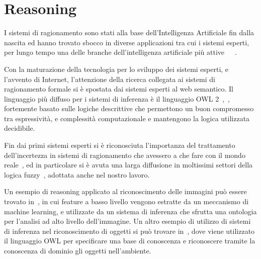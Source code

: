 \section{Reasoning}

I sistemi di ragionamento sono stati alla base dell'Intelligenza Artificiale fin dalla nascita ed hanno trovato sbocco in diverse applicazioni tra cui i sistemi esperti, per lungo tempo una delle branche dell'intelligenza artificiale più attive~\cite{buchanan1984rule}~\cite{davis1977production}~\cite{joseph1994riley}.

Con la maturazione della tecnologia per lo sviluppo dei sistemi esperti, e l'avvento di Internet, l'attenzione della ricerca collegata ai sistemi di ragionamento formale si è spostata dai sistemi esperti al web semantico.
Il linguaggio più diffuso per i sistemi di inferenza è il linguaggio OWL 2~\cite{owl2-overview},~\cite{owl2-primer}, fortemente basato sulle logiche descrittive che permettono un buon compromesso tra espressività, e complessità computazionale e mantengono la logica utilizzata decidibile.

Fin dai primi sistemi esperti si è riconosciuta l'importanza del trattamento dell'incertezza in sistemi di ragionamento che avessero a che fare con il mondo reale~\cite{davis1977production}, ed in particolare si è avuta una larga diffusione in moltissimi settori della logica fuzzy~\cite{Zadeh1965338}, adottata anche nel nostro lavoro.

Un esempio di reasoning applicato al riconoscimento delle immagini può essere trovato in~\cite{DBLP:journals/ivc/MaillotT08}, in cui feature a basso livello vengono estratte da un meccanismo di machine learning, e utilizzate da un sistema di inferenza che sfrutta una ontologia per l'analisi ad alto livello dell'immagine. Un altro esempio di utilizzo di sistemi di inferenza nel riconoscimento di oggetti si può trovare in~\cite{DBLP:journals/corr/abs-1301-4991}, dove viene utilizzato il linguaggio OWL per specificare una base di conoscenza e riconoscere tramite la conoscenza di dominio gli oggetti nell'ambiente.

